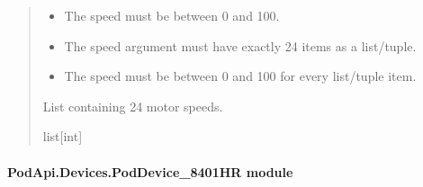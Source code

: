 \documentclass[letterpaper,10pt,english]{sphinxmanual}
\begin{document}
\begin{fulllineitems}
\begin{fulllineitems}
\begin{quote}
\begin{description}
\begin{itemize}
\item {} 
\sphinxAtStartPar
{} \textendash{} The speed must be between 0 and 100.

\item {} 
\sphinxAtStartPar
{} \textendash{} The speed argument must have exactly 24 items as a list/tuple.

\item {} 
\sphinxAtStartPar
{} \textendash{} The speed must be between 0 and 100 for every list/tuple item.

\end{itemize}

\sphinxAtStartPar
List containing 24 motor speeds.

\sphinxAtStartPar
list{[}int{]}

\end{description}\end{quote}

\end{fulllineitems}


\end{fulllineitems}



\paragraph{PodApi.Devices.PodDevice\_8401HR module}
\label{\detokenize{PodApi.Devices:module-PodApi.Devices.PodDevice_8401HR}}\label{\detokenize{PodApi.Devices:podapi-devices-poddevice-8401hr-module}}
\end{document}
